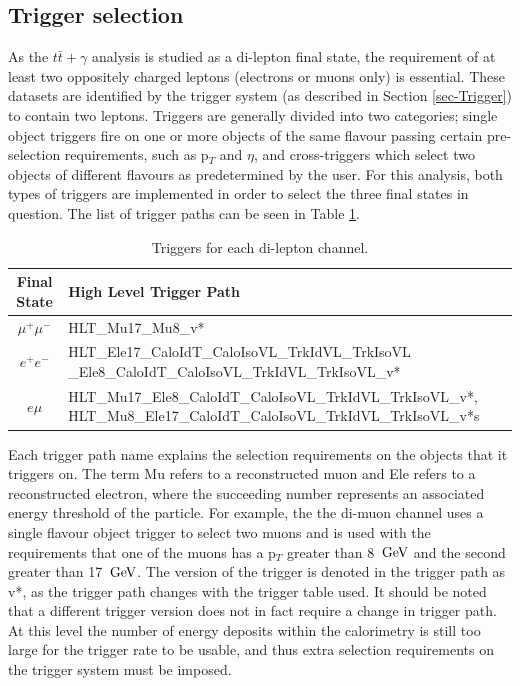 \subsection{Trigger selection}

As the $t\bar{t}+\gamma$ analysis is studied as a di-lepton final state, the requirement of at least two oppositely charged leptons (electrons or muons only) is essential. These datasets are identified by the trigger system (as described in Section \ref{sec-Trigger}) to contain two leptons. Triggers are generally divided into two categories; single object triggers fire on one or more objects of the same flavour passing certain pre-selection requirements, such as p$_T$ and $\eta$, and cross-triggers which select two objects of different flavours as predetermined by the user. For this analysis, both types of triggers are implemented in order to select the three final states in question. The list of trigger paths can be seen in Table \ref{tab-HLTriggers}. 

\begin{table} \label{tab-HLTriggers}
\begin{center}
\begin{tabular}{|c|p{11.5cm}|}
\hline
	\textbf{Final State} & \textbf{High Level Trigger Path} \\
\hline
	$\mu^+\mu^-$ & HLT\_Mu17\_Mu8\_v* \\
	$e^+e^-$ & HLT\_Ele17\_CaloIdT\_CaloIsoVL\_TrkIdVL\_TrkIsoVL
				\_Ele8\_CaloIdT\_CaloIsoVL\_TrkIdVL\_TrkIsoVL\_v* \\
	$e\mu$ & HLT\_Mu17\_Ele8\_CaloIdT\_CaloIsoVL\_TrkIdVL\_TrkIsoVL\_v*, HLT\_Mu8\_Ele17\_CaloIdT\_CaloIsoVL\_TrkIdVL\_TrkIsoVL\_v*s \\
\hline	
\end{tabular}
\caption{Triggers for each di-lepton channel.}
\end{center}
\end{table}

Each trigger path name explains the selection requirements on the objects that it triggers on. The term Mu refers to a reconstructed muon and Ele refers to a reconstructed electron, where the succeeding number represents an associated energy threshold of the particle. For example, the the di-muon channel uses a single flavour object trigger to select two muons and is used with the requirements that one of the muons has a p$_T$ greater than 8 $\,\text{Ge\hspace{-.08em}V}$ and the second greater than 17 $\,\text{Ge\hspace{-.08em}V}$. The version of the trigger is denoted in the trigger path as v*, as the trigger path changes with the trigger table used. It should be noted that a different trigger version does not in fact require a change in trigger path. At this level the number of energy deposits within the calorimetry is still too large for the trigger rate to be usable, and thus extra selection requirements on the trigger system must be imposed.

